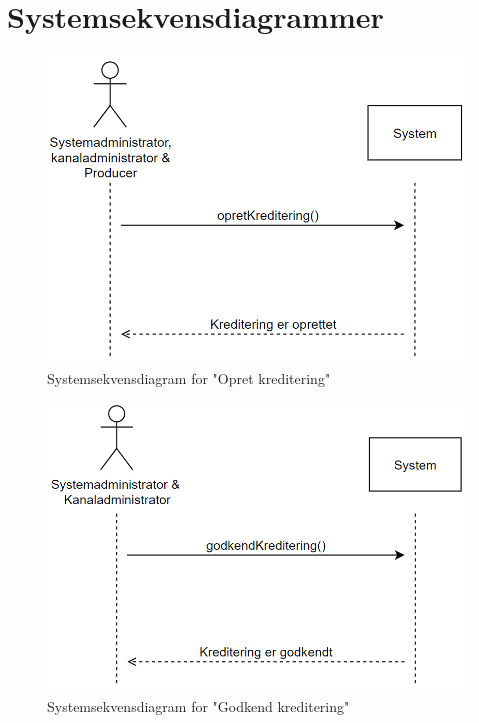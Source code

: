 \section{Systemsekvensdiagrammer}

\begin{figure}[H]
\centering
\includegraphics[scale=0.43]{figures/systemsekvensdiagrammer/opretKreditering.PNG}
\caption{Systemsekvensdiagram for "Opret kreditering"}
\label{fig:create_credit}
\end{figure}

\begin{figure}[H]
\centering
\includegraphics[scale=0.43]{figures/systemsekvensdiagrammer/godkendKreditering.PNG}
\caption{Systemsekvensdiagram for "Godkend kreditering"}
\label{fig:approve_credit}
\end{figure}

